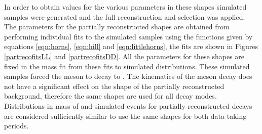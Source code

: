In order to obtain values for the various parameters in these shapes simulated samples were generated and the full reconstruction and selection was applied. The parameters for the partially reconstructed shapes are obtained from performing individual fits to the simulated samples using the functions given by equations \ref{eqn:horns}, \ref{eqn:hill} and \ref{eqn:littlehorns}, the fits are shown in Figures \ref{partrecofitsLL} and \ref{partrecofitsDD}. All the parameters for these shapes are fixed in the mass fit from these fits to simulated distributions. These simulated samples forced the \Dz meson to decay to \Km\pip. The kinematics of the \Dz meson decay does not have a significant effect on the shape of the partially reconstructed background, therefore the same shapes are used for all \Dz decay modes. Distributions in \Bm mass of \runone and \runtwo simulated events for partially reconstructed decays are considered sufficiently similar to use the same shapes for both data-taking periods.

